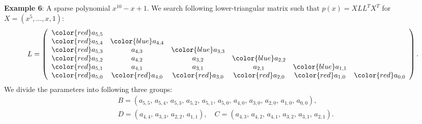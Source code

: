 \documentclass[runningheads]{llncs}
\begin{document}
{%

{\bf Example 6}: A sparse polynomial ${x}^{10}-x+1$. 
We search following lower-triangular matrix such that $p(x)=XLL^TX^T$ for $X=(x^5,\ldots,x,1)$:  
$$
L=\left(\begin{array}{cccccc}
{\color{red}a_{5,5}}&&&&&\\
{\color{red}a_{5,4}}&{\color{blue}a_{4,4}}&&&&\\
{\color{red}a_{5,3}}&a_{4,3}&{\color{blue}a_{3,3}}&&&\\
{\color{red}a_{5,2}}&a_{4,2}&a_{3,2}&{\color{blue}a_{2,2}}&&\\
{\color{red}a_{5,1}}&a_{4,1}&a_{3,1}&a_{2,1}&{\color{blue}a_{1,1}}&\\
{\color{red}a_{5,0}}&{\color{red}a_{4,0}}&{\color{red}a_{3,0}}&{\color{red}a_{2,0}}&{\color{red}a_{1,0}}&{\color{red}a_{0,0}}
\end{array}\right).
$$
We divide the parameters into following three groups:
\begin{align*}
&B=\left(
a_{5,5},\,a_{5,4},\,a_{5,3},\,a_{5,2},\,a_{5,1},\,a_{5,0},\,
a_{4,0},\,a_{3,0},\,a_{2,0},\,a_{1,0},\,a_{0,0}\right), \\
&D=\left(a_{4,4},\,a_{3,3},\,a_{2,2},\,a_{1,1}\right),
\quad
C=\left(a_{4,3},\,a_{4,2},\,a_{4,1},\,a_{3,2},\,a_{3,1},\,a_{2,1}\right).
\end{align*}

}
\end{document}

